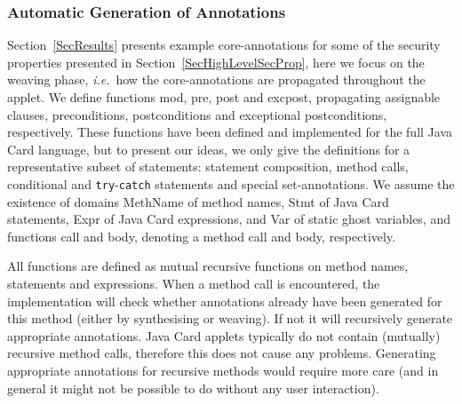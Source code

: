\subsubsection{Automatic Generation of Annotations}

Section~\ref{SecResults} presents example core-annotations for some of
the security properties presented in
Section~\ref{SecHighLevelSecProp}, here we focus on the weaving phase,
\emph{i.e.}~how the core-annotations are propagated throughout the
applet. We define functions \textsf{mod}, \textsf{pre}, \textsf{post} and
\textsf{exc\-post}, propagating assignable clauses, preconditions, 
postconditions and exceptional postconditions, respectively. These
functions have been defined and implemented for the full Java Card
language, but to present our ideas, we only give the definitions for a
representative subset of statements: statement composition, method
calls, conditional and \texttt{try}-\texttt{catch} statements and
special set-annotations. We assume the existence of domains
\textsf{MethName} of method names, \textsf{Stmt} of Java Card
statements, \textsf{Expr} of Java Card expressions, and \textsf{Var}
of static ghost variables, and functions
\textsf{call} and \textsf{body}, denoting a method call and 
body, respectively.

All functions are defined as mutual recursive functions on method
names, statements and expressions. When a method call is encountered,
the implementation will check whether annotations already have been
generated for this method (either by synthesising or weaving). If not
it will recursively generate appropriate annotations. Java Card
applets typically do not contain (mutually) recursive method calls,
therefore this does not cause any problems. Generating appropriate
annotations for recursive methods would require more care (and in
general it might not be possible to do without any user interaction).

